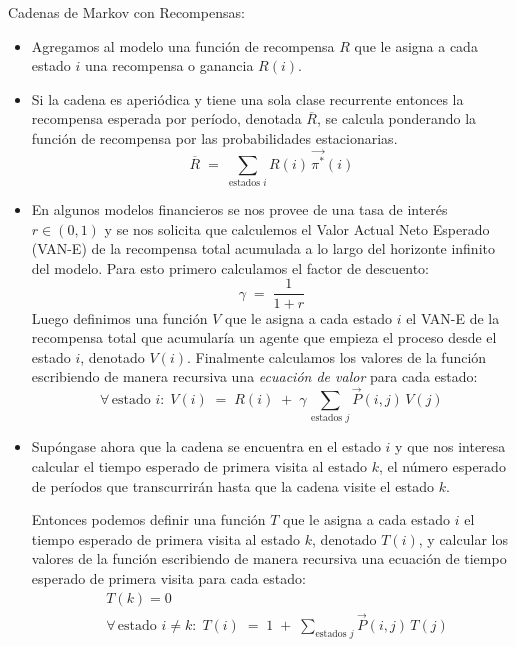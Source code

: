 \documentclass[ 10pt, xcolor = dvipsnames]{beamer}
\begin{document}
\begin{frame}[allowframebreaks]
\frametitle{\insertsubsection}

Cadenas de Markov con Recompensas: 
\begin{itemize}
\item Agregamos al modelo una funci\'on de recompensa $R$ que le asigna a cada estado $i$ una recompensa o ganancia $R(i)$. 
\item Si la cadena es aperi\'odica y tiene una sola clase recurrente entonces la recompensa esperada por per\'iodo, denotada $\overline{R}$, se calcula ponderando la funci\'on de recompensa por las probabilidades estacionarias. \Iec
\[
\overline{R} \; = \; \sum_{\text{estados }i} R(i) \, \vec{\pi^*}(i)
\]
\framebreak

\item En algunos modelos financieros se nos provee de una tasa de inter\'es $r \in (0,1)$ y se nos solicita que calculemos el Valor Actual Neto Esperado (VAN-E) de la recompensa total acumulada a lo largo del horizonte infinito del modelo. Para esto primero calculamos el factor de descuento:  
\[
\gamma \; = \; \frac{1}{1 + r}
\]
Luego definimos una funci\'on $V$ que le asigna a cada estado $i$ el VAN-E de la recompensa total que acumular\'ia un agente que empieza el proceso desde el estado $i$, denotado $V(i)$. Finalmente calculamos los valores de la funci\'on escribiendo de manera recursiva una \emph{ecuaci\'on de valor} para cada estado: 
\[
\forall \, \text{estado } i \colon \; V(i) \; = \; R(i) \; + \;
\gamma \, \sum_{\text{estados }j} \vec{P}(i,j) \, V(j)
\]
\framebreak

\item Sup\'ongase ahora que la cadena se encuentra en el estado $i$ y que nos interesa calcular el tiempo esperado de primera visita al estado $k$, \ie el n\'umero esperado de per\'iodos que transcurrir\'an hasta que la cadena visite el estado $k$. 

Entonces podemos definir una funci\'on $T$ que le asigna a cada estado $i$ el tiempo esperado de primera visita al estado $k$, denotado $T(i)$, y calcular los valores de la funci\'on escribiendo de manera recursiva una ecuaci\'on de tiempo esperado de primera visita para cada estado: 
\begin{align*}
& T(k) = 0 \\
& \forall \, \text{estado } i \neq k \colon \; T(i) \; = \; 1 \; + \;
\sum_{\text{estados }j} \vec{P}(i,j) \, T(j)
\end{align*}
\framebreak


\end{itemize}
\end{frame}
\end{document}
